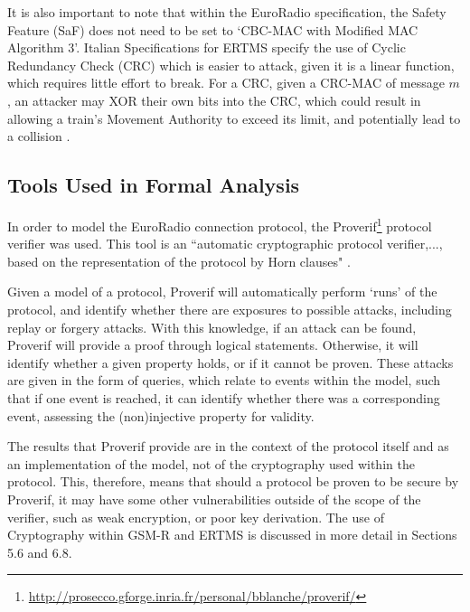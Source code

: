 \documentclass[twoside,11pt,a4paper]{article}
\begin{document}
It is also important to note that within the EuroRadio specification, the Safety Feature (SaF) does not need to be set to `CBC-MAC with Modified MAC Algorithm 3'. Italian Specifications for ERTMS specify the use of Cyclic Redundancy Check (CRC) which is easier to attack, given it is a linear function, which requires little effort to break. For a CRC, given a CRC-MAC of message $m$, an attacker may XOR their own bits into the CRC, which could result in allowing a train's Movement Authority to exceed its limit, and potentially lead to a collision \citep{Ferrovia09a} \citep{Lockstone00a}.

\subsection{Tools Used in Formal Analysis}
In order to model the EuroRadio connection protocol, the Proverif\footnote{\url{http://prosecco.gforge.inria.fr/personal/bblanche/proverif/}} protocol verifier was used. This tool is an ``automatic cryptographic protocol verifier,..., based on the representation of the protocol by Horn clauses" \citep{Proverif}.

Given a model of a protocol, Proverif will automatically perform `runs' of the protocol, and identify whether there are exposures to possible attacks, including replay or forgery attacks. With this knowledge, if an attack can be found, Proverif will provide a proof through logical statements. Otherwise, it will identify whether a given property holds, or if it cannot be proven. These attacks are given in the form of queries, which relate to events within the model, such that if one event is reached, it can identify whether there was a corresponding event, assessing the (non)injective property for validity.

The results that Proverif provide are in the context of the protocol itself and as an implementation of the model, not of the cryptography used within the protocol. This, therefore, means that should a protocol be proven to be secure by Proverif, it may have some other vulnerabilities outside of the scope of the verifier, such as weak encryption, or poor key derivation. The use of Cryptography within GSM-R and ERTMS is discussed in more detail in Sections 5.6 and 6.8.
\end{document}
